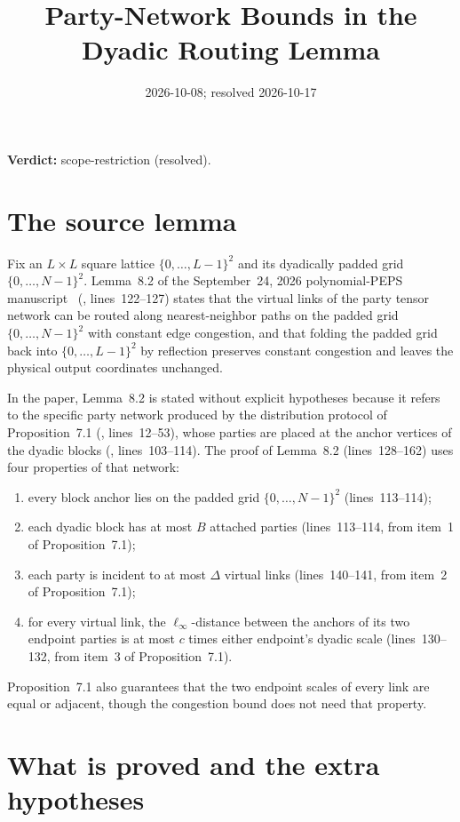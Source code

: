 \documentclass{article}
\title{Party-Network Bounds in the Dyadic Routing Lemma}
\author{}
\date{2026-10-08; resolved 2026-10-17}
\providecommand{\gapnote}[2]{\par\noindent\textbf{Verdict:} #1 (#2).\par}
\begin{document}
\maketitle
\gapnote{scope-restriction}{resolved}

\section{The source lemma}

Fix an $L\times L$ square lattice $\{0,\ldots,L-1\}^2$ and its dyadically
padded grid $\{0,\ldots,N-1\}^2$. Lemma~8.2 of the September~24, 2026
polynomial-PEPS manuscript~\cite{OpenAI2026PolynomialPEPS}
(, lines~122--127) states that the virtual links of the
party tensor network can be routed along nearest-neighbor paths on the padded
grid $\{0,\ldots,N-1\}^2$ with constant edge congestion, and that folding the
padded grid back into $\{0,\ldots,L-1\}^2$ by reflection preserves constant
congestion and leaves the physical output coordinates unchanged.

In the paper, Lemma~8.2 is stated without explicit hypotheses because it refers
to the specific party network produced by the distribution protocol of
Proposition~7.1 (, lines~12--53), whose parties are
placed at the anchor vertices of the dyadic blocks (,
lines~103--114). The proof of Lemma~8.2 (lines~128--162) uses four properties
of that network:
\begin{enumerate}
\item every block anchor lies on the padded grid $\{0,\ldots,N-1\}^2$
  (lines~113--114);
\item each dyadic block has at most $B$ attached parties (lines~113--114, from
  item~1 of Proposition~7.1);
\item each party is incident to at most $\Delta$ virtual links
  (lines~140--141, from item~2 of Proposition~7.1);
\item for every virtual link, the $\ell_\infty$-distance between the anchors of
  its two endpoint parties is at most $c$ times either endpoint's dyadic scale
  (lines~130--132, from item~3 of Proposition~7.1).
\end{enumerate}
Proposition~7.1 also guarantees that the two endpoint scales of every link are
equal or adjacent, though the congestion bound does not need that property.

\section{What is proved and the extra hypotheses}
\end{document}
